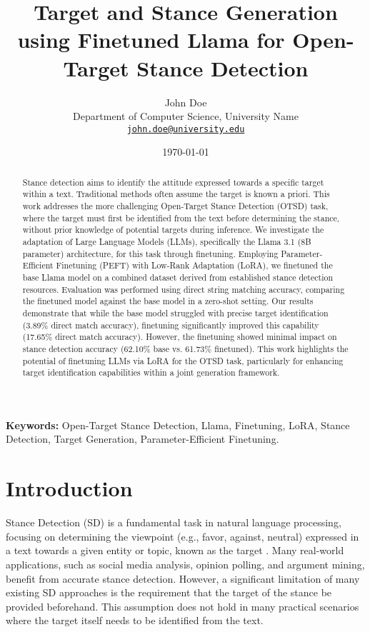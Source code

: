 \documentclass[twocolumn, 11pt,letterpaper]{article}
\title{Target and Stance Generation using Finetuned Llama for Open-Target Stance Detection}
\author{John Doe \\ %
        Department of Computer Science, University Name \\ %
        \href{mailto:john.doe@university.edu}{\texttt{john.doe@university.edu}} %
        }
\date{\today} %
\begin{document}
\maketitle

\begin{abstract}
Stance detection aims to identify the attitude expressed towards a specific target within a text. Traditional methods often assume the target is known a priori. This work addresses the more challenging Open-Target Stance Detection (OTSD) task, where the target must first be identified from the text before determining the stance, without prior knowledge of potential targets during inference. We investigate the adaptation of Large Language Models (LLMs), specifically the Llama 3.1 (8B parameter) architecture, for this task through finetuning. Employing Parameter-Efficient Finetuning (PEFT) with Low-Rank Adaptation (LoRA), we finetuned the base Llama model on a combined dataset derived from established stance detection resources. Evaluation was performed using direct string matching accuracy, comparing the finetuned model against the base model in a zero-shot setting. Our results demonstrate that while the base model struggled with precise target identification (3.89\% direct match accuracy), finetuning significantly improved this capability (17.65\% direct match accuracy). However, the finetuning showed minimal impact on stance detection accuracy (62.10\% base vs. 61.73\% finetuned). This work highlights the potential of finetuning LLMs via LoRA for the OTSD task, particularly for enhancing target identification capabilities within a joint generation framework.
\end{abstract}

\noindent\textbf{Keywords:} Open-Target Stance Detection, Llama, Finetuning, LoRA, Stance Detection, Target Generation, Parameter-Efficient Finetuning.


\section{Introduction}
\label{sec:introduction}

Stance Detection (SD) is a fundamental task in natural language processing, focusing on determining the viewpoint (e.g., favor, against, neutral) expressed in a text towards a given entity or topic, known as the target \cite{akash2024}. Many real-world applications, such as social media analysis, opinion polling, and argument mining, benefit from accurate stance detection. However, a significant limitation of many existing SD approaches is the requirement that the target of the stance be provided beforehand. This assumption does not hold in many practical scenarios where the target itself needs to be identified from the text.
\end{document}
